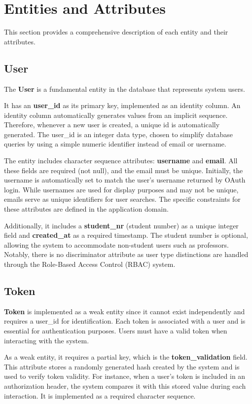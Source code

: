 \documentclass[a4paper,twoside,11pt]{article}
\begin{document}
\section{Entities and Attributes}
This section provides a comprehensive description of each entity and their attributes.
\subsection{User}
The \textbf{User} is a fundamental entity in the database that represents system users.

It has an \textbf{user\_id} as its primary key, implemented as an identity column. An identity column automatically generates values from an implicit sequence.
Therefore, whenever a new user is created, a unique id is automatically generated. The user\_id is an integer data type, chosen to simplify database queries by using a simple numeric identifier instead of email or username.

The entity includes character sequence attributes: \textbf{username} and \textbf{email}. All these fields are required (not null), and the email must be unique.
Initially, the username is automatically set to match the user's username returned by OAuth login. While usernames are used for display purposes and may not be unique, emails serve as unique identifiers for user searches. The specific constraints for these attributes are defined in the application domain.

Additionally, it includes a \textbf{student\_nr} (student number) as a unique integer field and \textbf{created\_at} as a required timestamp.
The student number is optional, allowing the system to accommodate non-student users such as professors. Notably, there is no discriminator attribute as user type distinctions are handled through the Role-Based Access Control (RBAC) system.

\subsection{Token}
\textbf{Token} is implemented as a weak entity since it cannot exist independently and requires a user\_id for identification. Each token is associated with a user and is essential for authentication purposes. Users must have a valid token when interacting with the system.

As a weak entity, it requires a partial key, which is the \textbf{token\_validation} field. This attribute stores a randomly generated hash created by the system and is used to verify token validity. 
For instance, when a user's token is included in an authorization header, the system compares it with this stored value during each interaction. It is implemented as a required character sequence.
\end{document}
